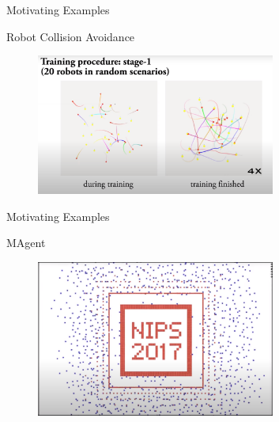 \documentclass[presentation, 8pt]{beamer}\mode<presentation>{\usetheme{AMSBolognaFC}}
\begin{document}
\begin{frame}{Motivating Examples}
	\begin{exampleblock}{Robot Collision Avoidance}
		\centering
		\begin{figure}
			\href{https://www.youtube.com/watch?v=Uj1yAmlL5lk}{\includegraphics[width=0.7\textwidth]{img/collective-learning.png}}
		\end{figure}
	\end{exampleblock}
\end{frame}
\begin{frame}{Motivating Examples}
	\begin{exampleblock}{MAgent}
		\begin{figure}
			\href{https://www.youtube.com/watch?v=HCSm0kVolqI}{\includegraphics[width=0.7\textwidth]{img/magent.png}}
		\end{figure}
	\end{exampleblock}
\end{frame}
\end{document}
